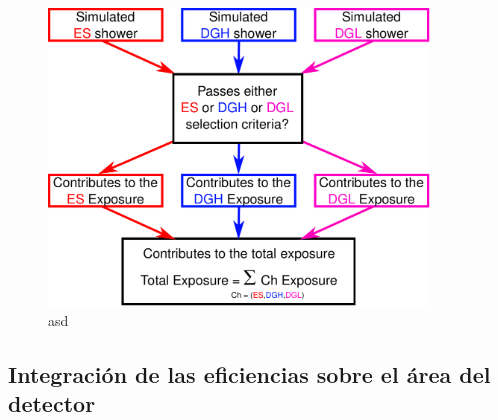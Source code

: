 	\begin{figure}[h!]
		\begin{center}
			\includegraphics[width=0.9\textwidth]{fig/resultadosAuger/sketch_combined_4}
			\caption{asd}
			\label{fig:sketch_combined_4}
		\end{center}
	\end{figure}
	
% 
% 
	
	\subsection{Integración de las eficiencias sobre el área del detector}
	
